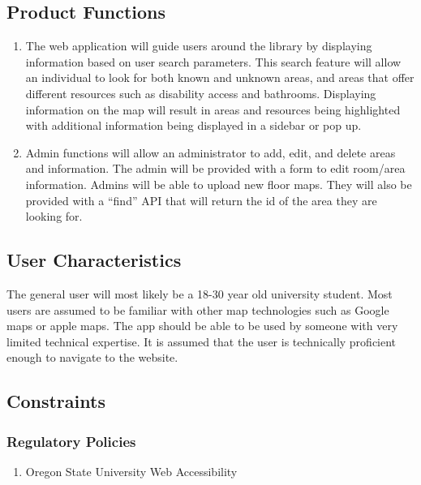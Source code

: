 \documentclass[letterpaper,10pt,titlepage]{article}
\begin{document}
\subsection{Product Functions}
\begin{enumerate}
	\item The web application will guide users around the library by displaying information based on user search parameters. This search feature will allow an individual to look for both known and unknown areas, and areas that offer different resources such as disability access and bathrooms. Displaying information on the map will result in areas and resources being highlighted with additional information being displayed in a sidebar or pop up.
    \item Admin functions will allow an administrator to add, edit, and delete areas and information. The admin will be provided with a form to edit room/area information. Admins will be able to upload new floor maps. They will also be provided with a “find” API that will return the id of the area they are looking for.
\end{enumerate}

\subsection{User Characteristics}
The general user will most likely be a 18-30 year old university student. Most users are assumed to be familiar with other map technologies such as Google maps or apple maps. The app should be able to be used by someone with very limited technical expertise. It is assumed that the user is technically proficient enough to navigate to the website.

\subsection{Constraints}

\subsubsection{Regulatory Policies}
\begin{enumerate}
	\item Oregon State University Web Accessibility
\end{enumerate}

\end{document}
